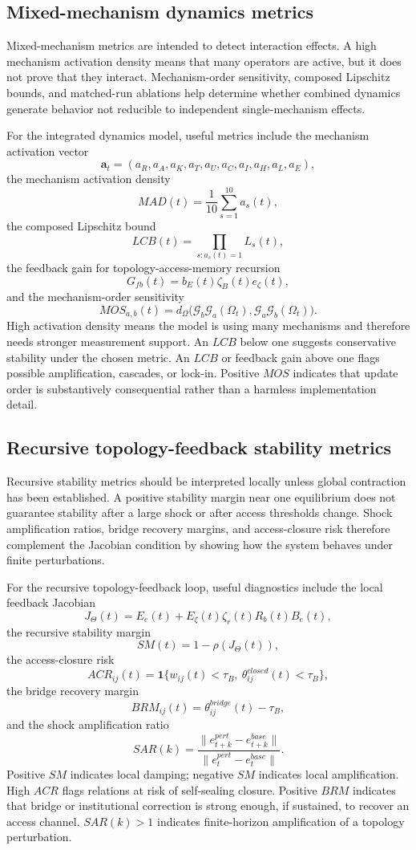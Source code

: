 \documentclass[11pt]{article}
\theoremstyle{remark}
\begin{document}
\subsection{Mixed-mechanism dynamics metrics}\label{mixed-mechanism-dynamics-metrics}

Mixed-mechanism metrics are intended to detect interaction effects. A high mechanism activation density means that many operators are active, but it does not prove that they interact. Mechanism-order sensitivity, composed Lipschitz bounds, and matched-run ablations help determine whether combined dynamics generate behavior not reducible to independent single-mechanism effects.


For the integrated dynamics model, useful metrics include the mechanism activation vector
\[
\mathbf a_t=(a_R,a_A,a_K,a_T,a_U,a_C,a_I,a_H,a_L,a_E),
\]
the mechanism activation density
\[
MAD(t)=\frac{1}{10}\sum_{s=1}^{10}a_s(t),
\]
the composed Lipschitz bound
\[
LCB(t)=\prod_{s:a_s(t)=1}L_s(t),
\]
the feedback gain for topology-access-memory recursion
\[
G_{fb}(t)=b_E(t)\zeta_B(t)e_\zeta(t),
\]
and the mechanism-order sensitivity
\[
MOS_{a,b}(t)=d_\Omega\big(\mathscr G_b\mathscr G_a(\Omega_t),\mathscr G_a\mathscr G_b(\Omega_t)\big).
\]
High activation density means the model is using many mechanisms and therefore needs stronger measurement support. An \(LCB\) below one suggests conservative stability under the chosen metric. An \(LCB\) or feedback gain above one flags possible amplification, cascades, or lock-in. Positive \(MOS\) indicates that update order is substantively consequential rather than a harmless implementation detail.

\subsection{Recursive topology-feedback stability metrics}\label{recursive-topology-feedback-stability-metrics}

Recursive stability metrics should be interpreted locally unless global contraction has been established. A positive stability margin near one equilibrium does not guarantee stability after a large shock or after access thresholds change. Shock amplification ratios, bridge recovery margins, and access-closure risk therefore complement the Jacobian condition by showing how the system behaves under finite perturbations.


For the recursive topology-feedback loop, useful diagnostics include the local feedback Jacobian
\[
J_\Theta(t)=E_e(t)+E_\zeta(t)\zeta_r(t)R_b(t)B_e(t),
\]
the recursive stability margin
\[
SM(t)=1-\rho(J_\Theta(t)),
\]
the access-closure risk
\[
ACR_{ij}(t)=\mathbf 1\{w_{ij}(t)<\tau_B,\ \theta_{ij}^{closed}(t)<\tau_B\},
\]
the bridge recovery margin
\[
BRM_{ij}(t)=\theta_{ij}^{bridge}(t)-\tau_B,
\]
and the shock amplification ratio
\[
SAR(k)=\frac{\|e_{t+k}^{pert}-e_{t+k}^{base}\|}{\|e_t^{pert}-e_t^{base}\|}.
\]
Positive \(SM\) indicates local damping; negative \(SM\) indicates local amplification. High \(ACR\) flags relations at risk of self-sealing closure. Positive \(BRM\) indicates that bridge or institutional correction is strong enough, if sustained, to recover an access channel. \(SAR(k)>1\) indicates finite-horizon amplification of a topology perturbation.
\end{document}
